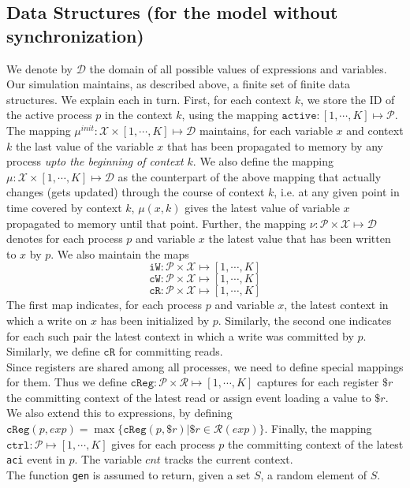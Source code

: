 \documentclass{article}
\newcommand{\var}{\texttt}
\begin{document}
\subsection{Data Structures (for the model without synchronization)}
We denote by $\mathcal{D}$ the domain of all possible values of expressions and variables. Our simulation maintains, as described above, a finite set of finite data structures. We explain each in turn. First, for each context $k$, we store the ID of the active process $p$ in the context $k$, using the mapping $\texttt{active}: [1,\cdots,K] \mapsto \mathcal{P}$. The mapping $\mu^{init}: \mathcal{X} \times [1,\cdots,K] \mapsto \mathcal{D}$ maintains, for each variable $x$ and context $k$ the last value of the variable $x$ that has been propagated to memory by any process \textit{upto the beginning of context $k$}. We also define the mapping $\mu: \mathcal{X} \times [1,\cdots,K] \mapsto \mathcal{D}$ as the counterpart of the above mapping that actually changes (gets updated) through the course of context $k$, i.e. at any given point in time covered by context $k$, $\mu(x,k)$ gives the latest value of variable $x$ propagated to memory until that point.  Further, the mapping $\nu: \mathcal{P} \times \mathcal{X} \mapsto \mathcal{D}$ denotes for each process $p$ and variable $x$ the latest value that has been written to $x$ by $p$. We also maintain the maps $$\texttt{iW}: \mathcal{P} \times \mathcal{X} \mapsto [1,\cdots,K]$$
$$\texttt{cW}: \mathcal{P} \times \mathcal{X} \mapsto [1,\cdots,K]$$
$$\texttt{cR}: \mathcal{P} \times \mathcal{X} \mapsto [1,\cdots,K]$$
The first map indicates, for each process $p$ and variable $x$, the latest context in which a write on $x$ has been initialized by $p$. Similarly, the second one indicates for each such pair the latest context in which a write was committed by $p$. Similarly, we define $\var{cR}$ for committing reads.\\
Since registers are shared among all processes, we need to define special mappings for them. Thus we define $\var{cReg}: \mathcal{P} \times \mathcal{R} \mapsto [1,\cdots,K]$ captures for each register $\$r$ the committing context of the latest read or assign event loading a value to $\$r$. We also extend this to expressions, by defining $\var{cReg}(p,exp) = \max \{\var{cReg}(p,\$r) | \$r \in \mathcal{R}(exp)\}$.
Finally, the mapping $\var{ctrl}: \mathcal{P} \mapsto [1,\cdots,K]$ gives for each process $p$ the committing context of the latest \var{aci} event in $p$. The variable $cnt$ tracks the current context.\\
The function \var{gen} is assumed to return, given a set $S$, a random element of $S$.
\end{document}
